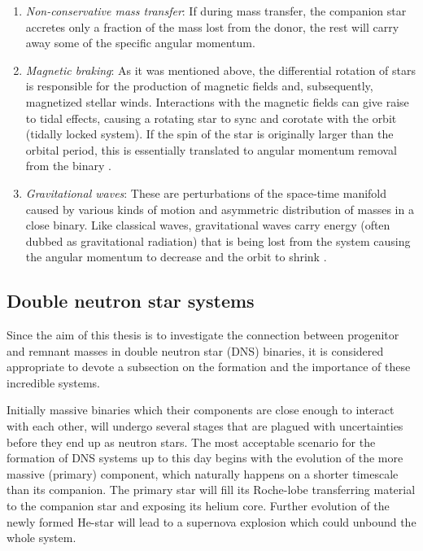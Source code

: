 \documentclass[../../main/thesis_msc.tex]{subfiles}
\begin{document}
				\begin{enumerate}[label=(\roman*)]
				
					\item \emph{Non-conservative mass transfer}: If during mass transfer, the companion star accretes only a fraction of the mass lost from the donor, the rest will carry away some of the specific angular momentum.
					\item \emph{Magnetic braking}: As it was mentioned above, the differential rotation of stars is responsible for the production of magnetic fields and, subsequently, magnetized stellar winds. Interactions with the magnetic fields can give raise to tidal effects, causing a rotating star to sync and corotate with the orbit (tidally locked system). If the spin of the star is originally larger than the orbital period, this is essentially translated to angular momentum removal from the binary \citep[see also][]{Rappaport1983}.
					\item \emph{Gravitational waves}:  These are perturbations of the space-time manifold caused by various kinds of motion and asymmetric distribution of masses in a close binary. Like classical waves, gravitational waves carry energy (often dubbed as gravitational radiation) that is being lost from the system causing the angular momentum to decrease and the orbit to shrink \citep[see also][]{Peters1964, Riles2013}.
				
				\end{enumerate}
				
				
			\subsection{Double neutron star systems}
			
				Since the aim of this thesis is to investigate the connection between progenitor and remnant masses in double neutron star (DNS) binaries, it is considered appropriate to devote a subsection on the formation and the importance of these incredible systems.
				
				Initially massive binaries which their components are close enough to interact with each other, will undergo several stages that are plagued with uncertainties before they end up as neutron stars. The most acceptable scenario for the formation of DNS systems up to this day begins with the evolution of the more massive (primary) component, which naturally happens on a shorter timescale than its companion. The primary star will fill its Roche-lobe transferring material to the companion star and exposing its helium core. Further evolution of the newly formed He-star will lead to a supernova explosion which could unbound the whole system. 
				
\end{document}
